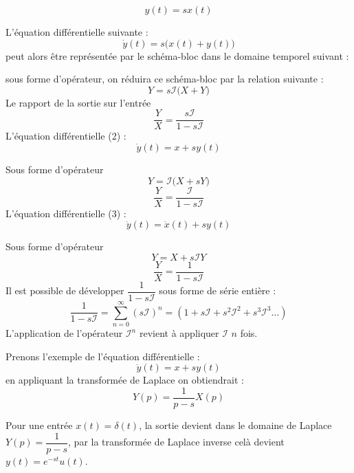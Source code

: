 \begin{center}
    
\end{center}
\[
    y(t)=sx(t)
\]

L'équation différentielle suivante :
\[
    \dot{y}(t)=s\big(x(t)+y(t)\big)
\]
peut alors être représentée par le schéma-bloc dans le domaine temporel suivant :

\begin{center}
    
\end{center}

sous forme d'opérateur, on réduira ce schéma-bloc par la relation suivante :
\[
    Y=s\mathcal{I}\big(X+Y\big)
\]
Le rapport de la sortie sur l'entrée
\[
    \dfrac{Y}{X}=\dfrac{s\mathcal{I}}{1-s\mathcal{I}}
\]
L'équation différentielle (2) :
\[
    \dot{y}(t)=x+sy(t)
\]

\begin{center}
    
\end{center}

Sous forme d'opérateur
\[
    Y=\mathcal{I}\big(X+sY\big)
\]
\[
    \dfrac{Y}{X}=\dfrac{\mathcal{I}}{1-s\mathcal{I}}
\]
L'équation différentielle (3) :
\[
    \dot{y}(t)=\dot{x}(t)+sy(t)
\]
\begin{center}
    
\end{center}
Sous forme d'opérateur
\[
    Y=X+s\mathcal{I}Y
\]
\[
    \dfrac{Y}{X}=\dfrac{1}{1-s\mathcal{I}}
\]
Il est possible de développer $\dfrac{1}{1-s\mathcal{I}}$ sous forme de série entière :
\[
    \dfrac{1}{1-s\mathcal{I}}=\sum_{n=0}^{\infty}(s\mathcal{I})^n=(1+s\mathcal{I}+s^2\mathcal{I}^2+s^3\mathcal{I}^3\ldots)
\]
L'application de l'opérateur $\mathcal{I}^n$ revient à appliquer $\mathcal{I}$ $n$ fois.

Prenons l'exemple de l'équation différentielle :
\[
    \dot{y}(t)=x+sy(t)
\]
en appliquant la transformée de Laplace on obtiendrait :
\[
    Y(p)=\dfrac{1}{p-s}X(p)
\]

Pour une entrée $x(t)=\delta(t)$, la sortie devient dans le domaine de Laplace $Y(p)=\dfrac{1}{p-s}$, par la transformée de Laplace
inverse celà devient $y(t)=e^{-st}u(t)$.
\clearpage
